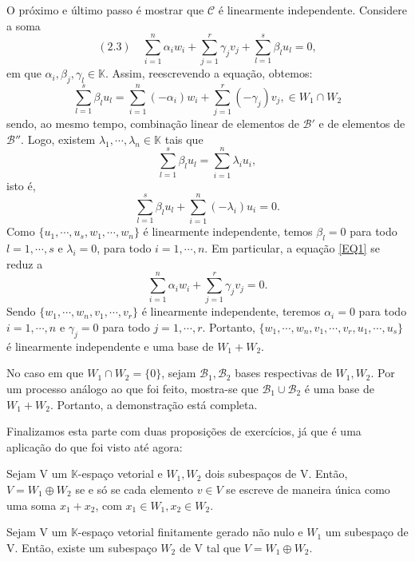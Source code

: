 \begin{proof*}
O pr\'oximo e \'ultimo passo \'e mostrar que $\mathcal{C}$ \'e linearmente independente. Considere a soma 
$$
    (2.3)\quad\sum_{i=1}^{n}\alpha_{i}w_{i} + \sum_{j=1}^{r}\gamma_{j}v_{j} + \sum_{l=1}^{s}\beta_{l}u_{l} = 0, \label{EQ1}
$$
em que $\alpha_{i}, \beta_{j}, \gamma_{l}\in\mathbb{K}$. Assim, reescrevendo a equa\c c\~ao, obtemos:
$$
    \sum_{l=1}^{s}\beta_{l}u_{l} = \sum_{i=1}^{n}(-\alpha_{i})w_{i} + \sum_{j=1}^{r}(-\gamma_{j})v_{j}, \in{W_1\cap{W_2}}
$$
sendo, ao mesmo tempo, combina\c c\~ao linear de elementos de $\mathcal{B'}$ e de elementos de $\mathcal{B''}.$ 
Logo, existem $\lambda_1, \cdots, \lambda_n\in\mathbb{K}$ tais que 
$$
    \sum_{l=1}^{s}\beta_{l}u_{l} = \sum_{i=1}^{n}\lambda_{i}u_{i}, 
$$
isto \'e, 
$$
    \sum_{l=1}^{s}\beta_{l}u_{l} + \sum_{i=1}^{n}(-\lambda_{i})u_{i} = 0.
$$
Como $\{u_1, \cdots, u_s, w_1, \cdots, w_n\}$ \'e linearmente independente, temos $\beta_l = 0$ para todo 
$l = 1, \cdots, s$ e $\lambda_i = 0$, para todo $i = 1, \cdots, n.$ Em particular, a equa\c c\~ao \ref{EQ1} se reduz
a 
$$
    \sum_{i=1}^{n}\alpha_{i}w_{i} + \sum_{j=1}^{r}\gamma_{j}v_{j} = 0.
$$
Sendo $\{w_1, \cdots, w_n, v_1, \cdots, v_r\}$ \'e linearmente independente, teremos $\alpha_{i} = 0$ para todo
$i = 1, \cdots, n$ e $\gamma_{j} = 0$ para todo $j = 1, \cdots, r$. Portanto, $\{w_1, \cdots, w_n, v_1, \cdots, v_r, u_1,
\cdots, u_s\}$ \'e linearmente independente e uma base de $W_1 + W_2.$

No caso em que $W_1\cap{W_2} = \{0\}$, sejam $\mathcal{B_1}, \mathcal{B_2}$ bases respectivas de $W_1, W_2$. Por um
processo an\'alogo ao que foi feito, mostra-se que $\mathcal{B_1}\cup\mathcal{B_2}$ \'e uma base de $W_1 + W_2$. 
Portanto, a demonstra\c c\~ao est\'a completa. 

\end{proof*}
Finalizamos esta parte com duas proposi\c c\~oes de exerc\'icios, j\'a que \'e uma aplica\c c\~ao do que foi visto
at\'e agora:
\begin{proposition*}
    Sejam V um $\mathbb{K}$-espa\c co vetorial e $W_1, W_2$ dois subespa\c cos de V. Ent\~ao, $V = W_1 \oplus W_2$ se e 
s\'o se cada elemento $v\in{V}$ se escreve de maneira \'unica como uma soma $x_1 + x_2$, com $x_1\in{W_1}, x_2\in{W_2}.$
\end{proposition*}
\begin{proposition*}
    Sejam V um $\mathbb{K}$-espa\c co vetorial finitamente gerado n\~ao nulo e $W_1$ um subespa\c co de V. Ent\~ao,
existe um subespa\c co $W_2$ de V tal que $V = W_1 \oplus W_2$.
\end{proposition*}


